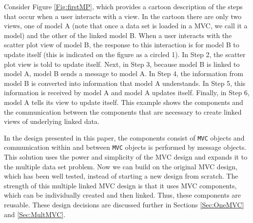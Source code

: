 \documentclass{article}[11pt]
\newcommand{\Robject}[1]{{\texttt{#1}}}
\begin{document}
Consider Figure \ref{Fig:firstMP}, which provides a cartoon
description of the steps that occur when a user interacts with a
view.  In the cartoon there are only two views, one of model A (note 
that once a data set is loaded in a MVC, we call it a model) and the
other of the linked model B.  When a user interacts with the scatter plot view
of model B, the response to this interaction is for model B to update itself
(this is indicated on the figure as a circled 1).  In Step 2, the scatter plot
view is told to update itself.  Next, in Step 3, because model B is linked
to model A, model B sends a message to model A.  In Step 4,
the information from model B is converted into information that
model A understands.  In Step 5, this information is received by
model A and model A updates itself.  Finally, in Step 6, model
A tells its view to update itself.  This example shows the components
and the communication between the components that are necessary to create
linked views of underlying linked data.  

In the design presented in this paper, the components consist of \Robject{MVC}
objects and communication within and between \Robject{MVC} objects is
performed by message objects.  This solution uses the power and simplicity of
the MVC design and expands it to the multiple data set problem.  Now we can
build on the original MVC design, which has been well tested, instead of
starting a new design from scratch.  The strength of this multiple linked MVC
design is that it uses MVC components, which can be individually created and
then linked.  Thus, these components are reusable.  These design decisions are
discussed further in Sections \ref{Sec:OneMVC} and \ref{Sec:MultMVC}. 
\end{document}
